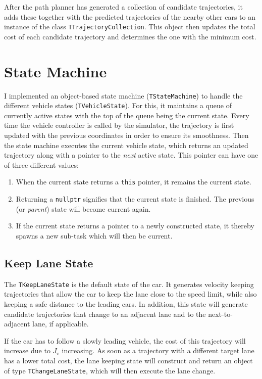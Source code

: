 \documentclass[twoside]{article}
\newcommand{\code}[1]{{\texttt{#1}}}
\begin{document}
After the path planner has generated a collection of candidate trajectories, it adds these
together with the predicted trajectories of the nearby other cars to an instance of the class
\code{TTrajectoryCollection}. This object then updates the total cost of each candidate
trajectory and determines the one with the minimum cost.

\section{State Machine}
I implemented an object-based state machine (\code{TStateMachine}) to handle the different
vehicle states (\code{TVehicleState}). For this, it maintains a queue of currently active states
with the top of the queue being the current state. Every time the vehicle controller is called
by the simulator, the trajectory is first updated with the previous coordinates in order to
ensure its smoothness. Then the state machine executes the current vehicle state, which returns
an updated trajectory along with a pointer to the \emph{next} active state. This pointer can
have one of three different values:
\begin{enumerate}
\item When the current state returns a \code{this} pointer, it remains the current state.
\item Returning a \code{nullptr} signifies that the current state is finished. The previous
(or \emph{parent}) state will become current again.
\item If the current state returns a pointer to a newly constructed state, it thereby spawns a new
sub-task which will then be current.
\end{enumerate}


\subsection{Keep Lane State}
The \code{TKeepLaneState} is the default state of the car. It generates velocity keeping
trajectories that allow the car to keep the lane close to the speed limit, while also keeping
a safe distance to the leading cars. In addition, this state will generate candidate
trajectories that change to an adjacent lane and to the next-to-adjacent lane, if applicable.

If the car has to follow a slowly leading vehicle, the cost of this trajectory will
increase due to $J_{v}$ increasing. As soon as a trajectory with a different target lane
has a lower total cost, the lane keeping state will construct and return an object of type \code{TChangeLaneState}, which will then execute the lane change.
\end{document}
